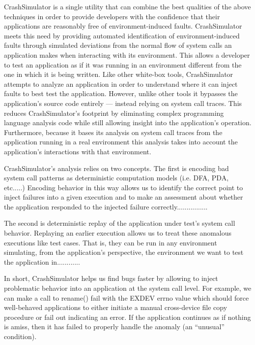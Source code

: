 CrashSimulator is a single utility that can combine the best qualities of the above techniques in order to provide
developers with the confidence that their applications are reasonably free of environment-induced faults.
CrashSimulator meets this need by providing automated identification of environment-induced faults through simulated
deviations from the normal flow of system calls an application makes when interacting with its environment.  This allows
a developer to test an application as if it was running in an environment different from the one in which it is being
written. Like other white-box tools, CrashSimulator attempts to analyze an application in order to understand where it
can inject faults to best test the application.  However, unlike other tools it bypasses the application's source code
entirely --- instead relying on system call traces.  This reduces CrashSimulator's footprint by eliminating complex
programming language analysis code while still allowing insight into the application's operation.  Furthermore, because
it bases its analysis on system call traces from the application running in a real environment this analysis takes into
account the application's interactions with that environment.

CrashSimulator's analysis relies on two concepts.  The first is encoding bad system call patterns as deterministic
computation models (i.e. DFA, PDA, etc.....) Encoding behavior in this way allows us to identify the correct point to
inject failures into a given execution and to make an assessment about whether the application responded to the injected
failure correctly................

The second is deterministic replay of the application under test's system call behavior.  Replaying an earlier execution
allows us to treat these anomalous executions like test cases.  That is, they can be run in any environment simulating,
from the application's perspective, the environment we want to test the application in............
    
In short, CrashSimulator helps us find bugs faster by allowing to inject problematic behavior into an application at the
system call level.  For example, we can make a call to rename() fail with the EXDEV errno value which should force
well-behaved applications to either initiate a manual cross-device file copy procedure or fail out indicating an error.
If the application continues as if nothing is amiss, then it has failed to properly handle the anomaly (an ``unusual''
condition).

